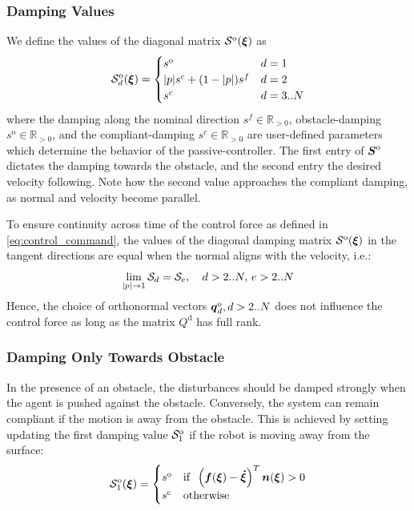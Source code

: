 \subsubsection{Damping Values}
We define the values of the diagonal matrix $\mathcal{S}^{\mathrm{o}}(\boldsymbol{\xi})$ as\begin{equation}
  \matd{S}_d^{\mathrm{o}}(\vecs \xi) =
  \begin{cases}
    s^{\mathrm{o}} & d = 1 \\
    | p | s^c + (1 - | p |) s^{f} & d = 2 \\
    s^c & d = 3 .. N
  \end{cases}
  \label{eq:obstacle_damping_values}
\end{equation}
where the damping along the nominal direction $s^{f} \in \mathbb{R}_{>0}$, obstacle-damping $s^{\mathrm{o}} \in \mathbb{R}_{>0}$, and the compliant-damping $s^c \in \mathbb{R}_{>0}$ are user-defined parameters which determine the behavior of the passive-controller. The first entry of $\boldsymbol{S}^{\mathrm{o}}$ dictates the damping towards the obstacle, and the second entry the desired velocity following. Note how the second value approaches the compliant damping, as normal and velocity become parallel.

To ensure continuity across time of the control force as defined in \eqref{eq:control_command}, the values of the diagonal damping matrix  $\mathcal{S}^{\mathrm{o}}(\boldsymbol{\xi})$ in the tangent directions are equal when the normal aligns with the velocity, i.e.:
\begin{equation}
    \lim_{| p | \rightarrow 1} \mathcal{S}_d = \mathcal{S}_e, 
    \quad d > 2 .. N, \, e > 2 .. N
\end{equation}
Hence, the choice of orthonormal vectors $\boldsymbol{q}_d^{\mathrm{o}}, d > 2 .. N$ does not influence the control force as long as the matrix $Q^{\mathrm{d}}$ has full rank.


\subsubsection{Damping Only Towards Obstacle} \label{sec:damping_only_toward}
In the presence of an obstacle, the disturbances should be damped strongly when the agent is pushed against the obstacle. Conversely, the system can remain compliant if the motion is away from the obstacle. This is achieved by setting updating the first damping value $\mathcal{S}^{\mathrm{o}}_1$ if the robot is moving away from the surface:
\begin{equation}
  \matd{S}_1^{\mathrm{o}} (\vecs \xi) =
  \begin{cases}
    s^{\mathrm{o}} & \text{if} \;\; \left(\vect f(\vecs \xi) - \vecs{\dot \xi} \right)^T \vecs n(\vect \xi) > 0 \\
    s^{\mathrm{c}} & \text{otherwise}
  \end{cases}
  \label{eq:leaving_compliance}
\end{equation}

